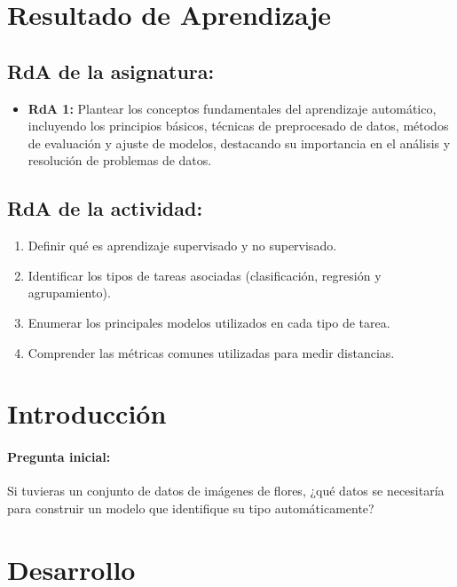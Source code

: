 \documentclass[a4,11pt]{aleph-notas}
\begin{document}
\encabezado

\section*{Resultado de Aprendizaje}

\subsection*{RdA de la asignatura:}
\begin{itemize}[leftmargin=*]
    \item \textbf{RdA 1:} 
    Plantear los conceptos fundamentales del aprendizaje automático, incluyendo los principios básicos, técnicas de preprocesado de datos, métodos de evaluación y ajuste de modelos, destacando su importancia en el análisis y resolución de problemas de datos.
\end{itemize}

\subsection*{RdA de la actividad:}
\begin{enumerate}[leftmargin=*]
    \item Definir qué es aprendizaje supervisado y no supervisado.
    \item Identificar los tipos de tareas asociadas (clasificación, regresión y agrupamiento).
    \item Enumerar los principales modelos utilizados en cada tipo de tarea.
    \item Comprender las métricas comunes utilizadas para medir distancias.
\end{enumerate}


\section*{Introducción}

\paragraph{Pregunta inicial:}  
Si tuvieras un conjunto de datos de imágenes de flores, ¿qué datos se necesitaría para construir un modelo que identifique su tipo automáticamente?


\section*{Desarrollo}
\end{document}
